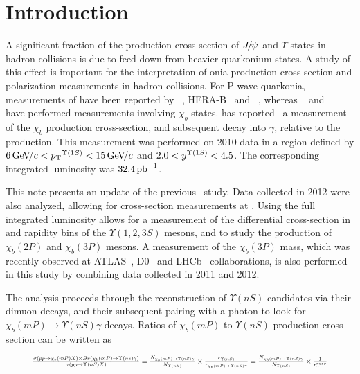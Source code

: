 \section{Introduction}
\label{sec:introduction}

A significant fraction of the production cross-section of ${{J\mskip -3mu/\mskip -2mu\psi\mskip 2mu}}$ and
$\Upsilon$ states in hadron collisions is due to feed-down from heavier
quarkonium states. A study of this effect is important for the interpretation of
onia production cross-section and polarization measurements in hadron
collisions. For P-wave quarkonia, measurements of \chic have been reported by
\cdf~\cite{Abulencia:2007bra}, HERA-B~\cite{Abt:2008ed}
and \lhcb~\cite{LHCb-PAPER-2011-019}, whereas \cdf~\cite{Affolder:1999wm} and 
\atlas~\cite{Aad:2011ih} have performed measurements involving $\chi_b$ states.
\lhcb has reported~\cite{LHCb-PAPER-2012-015} a measurement of
the $\chi_b$ production cross-section, and subsequent decay into \OneS $\gamma$,
relative to the \OneS production. This measurement was performed on 2010 data
in a region defined by $6 \gevc < \pt^{\Y1S} < 15 \gevc$ and
$2.0 < y^{\Y1S} < 4.5$.
The corresponding integrated luminosity was $32.4\mbox{\,pb}^{-1}$.

This note presents an update of the previous \lhcb\ study. Data collected in
2012 were also analyzed, allowing for cross-section measurements at \tev.
Using the full integrated luminosity allows for a measurement of the
differential cross-section in \pt and rapidity bins of the $\Upsilon(1,2,3S)$
mesons, and to study the production of $\chi_b(2P)$ and $\chi_b(3P)$ mesons. A
measurement of the $\chi_b(3P)$ mass, which was recently observed at
ATLAS~\cite{Aad:2011ih}, D0~\cite{Abazov:2012gh} and
LHCb~\cite{LHCb-CONF-2012-020} collaborations, is also performed in this study
by combining data collected in 2011 and 2012.

The analysis proceeds through the reconstruction of $\Upsilon(nS)$ candidates
via their dimuon decays, and their subsequent pairing with a photon to look for
$\chi_b(mP) \to \Upsilon(nS) \gamma$ decays. Ratios of $\chi_b(mP)$ to
$\Upsilon(nS)$ production cross section can be written as

\begin{equation}
\resizebox{.9\hsize}{!}{
$
\frac{\sigma(pp \to \chi_b (mP) X) \times Br (\chi_b (mP) \to \Upsilon(ns) \gamma)}{\sigma(pp \to \Upsilon(nS) X)} =
\frac{N_{\chi_b (mP)\to \Upsilon(nS) \gamma}}{N_{\Upsilon(nS)}} \times \frac{\epsilon_{\Upsilon(nS)}}{\epsilon_{\chi_b (mP)\to \Upsilon(nS) \gamma}} =
\frac{N_{\chi_b (mP)\to \Upsilon(nS) \gamma}}{N_{\Upsilon(nS)}} \times \frac{1}{\epsilon^{reco}_{\gamma}}
$
}
\label{eqn:master}
\end{equation}


